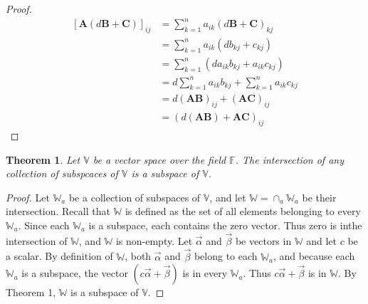 \documentclass{article}
\newtheorem{theorem}{Theorem}
\begin{document}
    \begin{proof}
        \begin{equation*}
            \begin{split}
                [\mathbf{A}(d \mathbf{B} + \mathbf{C})]_{ij} &= \sum_{k=1}^{n} a_{ik}(d \mathbf{B} + \mathbf{C})_{kj}\\
                                                             &= \sum_{k=1}^{n} a_{ik}(d b_{kj} + c_{kj})\\
                                                             &= \sum_{k=1}^{n} (d a_{ik} b_{kj} + a_{ik} c_{kj})\\
                                                             &= d \sum_{k=1}^{n} a_{ik} b_{kj} + \sum_{k=1}^{n} a_{ik} c_{kj}\\
                                                             &= d(\mathbf{A} \mathbf{B})_{ij} + (\mathbf{A} \mathbf{C})_{ij}\\
                                                             &= (d (\mathbf{A} \mathbf{B}) + \mathbf{A} \mathbf{C})_{ij}
            \end{split}
        \end{equation*}
    \end{proof}
    \begin{theorem}
        Let \(\mathbb{V}\) be a vector space over the field \(\mathbb{F}\). The intersection
        of any collection of subspcaces of \(\mathbb{V}\) is a subspace of \(\mathbb{V}\).
    \end{theorem}
    \begin{proof}
        Let \({\mathbb{W}_a}\) be a collection of subspaces of \(\mathbb{V}\), and let 
        \(\mathbb{W}=\cap_{a} \mathbb{W}_{a}\) be their intersection. Recall that 
        \(\mathbb{W}\) is defined as the set of all elements belonging to every \(\mathbb{W}_a\).
        Since each \(\mathbb{W}_{a}\) is a subspace, each contains the zero vector. Thus 
        zero is inthe intersection of \(\mathbb{W}\), and \(\mathbb{W}\) is non-empty. Let
        \(\vec{\alpha}\) and \(\vec{\beta}\) be vectors in \(\mathbb{W}\) and let \(c\) be a scalar.
        By definition of \(\mathbb{W}\), both \(\vec{\alpha}\) and \(\vec{\beta}\) belong to each
        \(\mathbb{W}_{a}\), and because each \(\mathbb{W}_{a}\) is a subspace, the vector \((c \vec{\alpha}+\vec{\beta})\)
        is in every \(\mathbb{W}_a\). Thus \(c \vec{\alpha} + \vec{\beta}\) is in \(\mathbb{W}\).
        By Theorem 1, \(\mathbb{W}\) is a subspace of \(\mathbb{V}\).
    \end{proof}
\end{document}
